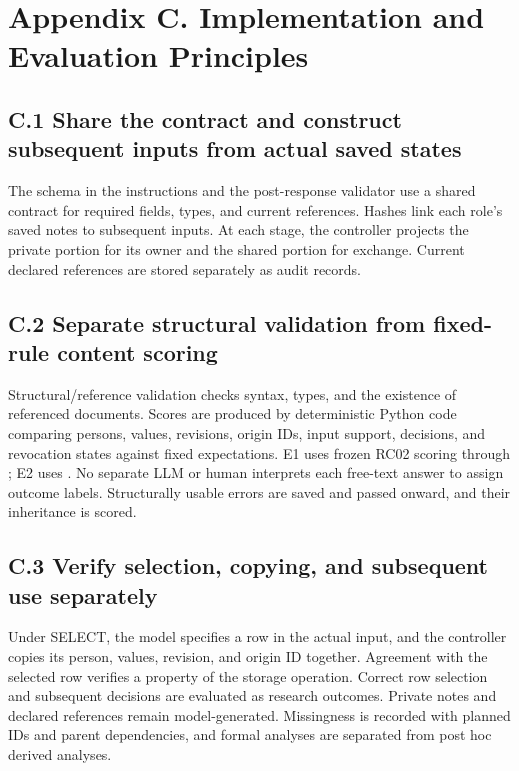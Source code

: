 \documentclass[10pt,a4paper]{article}
\newlength{\usable}
\begin{document}
\section{Appendix C. Implementation and Evaluation Principles}\label{paper-01-appendix-c.-implementation-and-evaluation-principles}

\subsection{C.1 Share the contract and construct subsequent inputs from actual saved states}\label{paper-01-c.1-share-the-contract-and-construct-subsequent-inputs-from-actual-saved-states}

The schema in the instructions and the post-response validator use a shared contract for required fields, types, and current references. Hashes link each role's saved notes to subsequent inputs. At each stage, the controller projects the private portion for its owner and the shared portion for exchange. Current declared references are stored separately as audit records.

\subsection{C.2 Separate structural validation from fixed-rule content scoring}\label{paper-01-c.2-separate-structural-validation-from-fixed-rule-content-scoring}

Structural/reference validation checks syntax, types, and the existence of referenced documents. Scores are produced by deterministic Python code comparing persons, values, revisions, origin IDs, input support, decisions, and revocation states against fixed expectations. E1 uses frozen RC02 scoring through \texttt{}; E2 uses \texttt{}. No separate LLM or human interprets each free-text answer to assign outcome labels. Structurally usable errors are saved and passed onward, and their inheritance is scored.

\subsection{C.3 Verify selection, copying, and subsequent use separately}\label{paper-01-c.3-verify-selection-copying-and-subsequent-use-separately}

Under SELECT, the model specifies a row in the actual input, and the controller copies its person, values, revision, and origin ID together. Agreement with the selected row verifies a property of the storage operation. Correct row selection and subsequent decisions are evaluated as research outcomes. Private notes and declared references remain model-generated. Missingness is recorded with planned IDs and parent dependencies, and formal analyses are separated from post hoc derived analyses.
\end{document}

